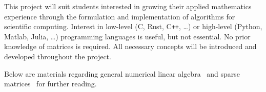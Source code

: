\documentclass{article}
\begin{document}
This project will suit students interested in growing their applied mathematics experience through the formulation and implementation of algorithms for scientific computing. Interest in low-level (C, Rust, C\texttt{++}, \dots) or high-level (Python, Matlab, Julia, \dots) programming languages is useful, but not essential. No prior knowledge of matrices is required. All necessary concepts will be introduced and developed throughout the project.

Below are materials regarding general numerical linear algebra~\cite{linalg} and sparse matrices~\cite{sparse} for further reading.

\printbibliography[heading=subbibcustom]
\end{document}
